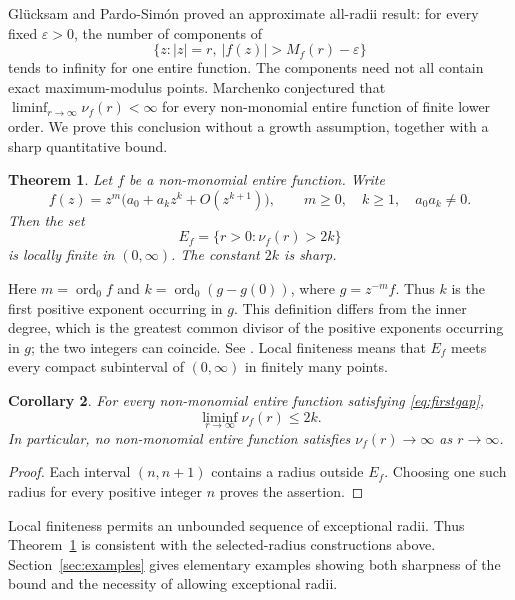 \documentclass[11pt,reqno]{amsart}
\newtheorem{theorem}{Theorem}[section]
\newtheorem{corollary}[theorem]{Corollary}
\theoremstyle{remark}
\numberwithin{equation}{section}
\newcommand{\ord}{\operatorname{ord}}
\begin{document}
Gl\"ucksam and Pardo-Sim\'on \cite{GlucksamPardo2024} proved an approximate
all-radii result: for every fixed $\varepsilon>0$, the number of
components of
\[
 \{z:|z|=r,\ |f(z)|>M_f(r)-\varepsilon\}
\]
tends to infinity for one entire function. The components need not all
contain exact maximum-modulus points. Marchenko
\cite[p.~215, Conjecture~1]{Marchenko2012} conjectured that
$\liminf_{r\to\infty}\nu_f(r)<\infty$ for every non-monomial entire
function of finite lower order. We prove this conclusion without a
growth assumption, together with a sharp quantitative bound.

\begin{theorem}\label{thm:main}
Let $f$ be a non-monomial entire function. Write
\begin{equation}\label{eq:firstgap}
 f(z)=z^m\bigl(a_0+a_kz^k+O(z^{k+1})\bigr),
 \qquad m\ge0,\quad k\ge1,\quad a_0a_k\ne0.
\end{equation}
Then the set
\[
 E_f=\{r>0:\nu_f(r)>2k\}
\]
is locally finite in $(0,\infty)$. The constant $2k$ is sharp.
\end{theorem}

Here $m=\ord_0 f$ and $k=\ord_0(g-g(0))$, where $g=z^{-m}f$.
Thus $k$ is the first positive exponent occurring in $g$.
This definition differs from the inner degree, which is the greatest
common divisor of the positive exponents occurring in $g$; the two
integers can coincide. See \cite{EvdoridouPardoSixsmith2021}.
Local finiteness means that $E_f$ meets every compact subinterval of
$(0,\infty)$ in finitely many points.

\begin{corollary}\label{cor:negative}
For every non-monomial entire function satisfying \eqref{eq:firstgap},
\[
 \liminf_{r\to\infty}\nu_f(r)\le2k.
\]
In particular, no non-monomial entire function satisfies
$\nu_f(r)\to\infty$ as $r\to\infty$.
\end{corollary}

\begin{proof}
Each interval $(n,n+1)$ contains a radius outside $E_f$. Choosing one
such radius for every positive integer $n$ proves the assertion.
\end{proof}

Local finiteness permits an unbounded sequence of exceptional radii.
Thus Theorem~\ref{thm:main} is consistent with the selected-radius
constructions above. Section~\ref{sec:examples} gives elementary
examples showing both sharpness of the bound and the necessity of
allowing exceptional radii.
\end{document}
